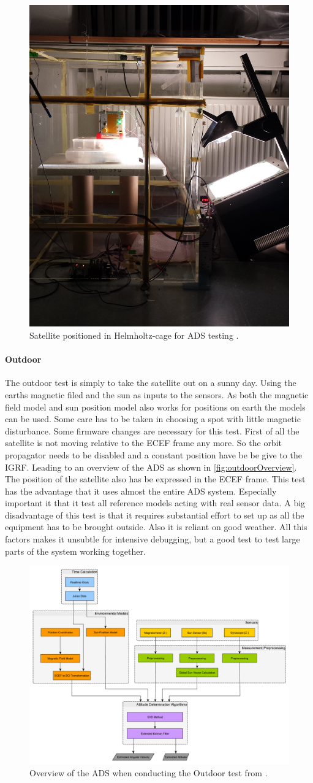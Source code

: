 \begin{figure}[tbp]
	\centering
	\includegraphics[width=0.3\columnwidth]{./Pictures/Helmholtz_night}
	\caption{Satellite positioned in Helmholtz-cage for ADS testing \cite{DavidThesis}.}
	\label{fig:Helmholtz-Cage}
\end{figure}               

\paragraph{Outdoor}
The outdoor test is simply to take the satellite out on a sunny day. Using the earths magnetic filed and the sun as inputs to the sensors. As both the magnetic field model and sun position model also works for positions on earth the models can be used. Some care has to be taken in choosing a spot with little magnetic disturbance. Some firmware changes are necessary for this test. First of all the satellite is not moving relative to the ECEF frame any more. So the orbit propagator needs to be disabled and a constant position have be be give to the IGRF. Leading to an overview of the ADS as shown in \autoref{fig:outdoorOverview}. The position of the satellite also has be expressed in the ECEF frame. This test has the advantage that it uses almost the entire ADS system. Especially important it that it test all reference models acting with real sensor data. A big disadvantage of this test is that it requires substantial effort to set up as all the equipment has to be brought outside. Also it is reliant on good weather. All this factors makes it unsubtle for intensive debugging, but a good test to test large parts of the system working together.         

\begin{figure}[tbp]
	\centering
	\includegraphics[width=0.5\columnwidth]{./Pictures/ATTDET_Architecture_O}
	\caption{Overview of the ADS when conducting the Outdoor test from \cite{DavidThesis}.}
	\label{fig:outrdoorOverview}
\end{figure}

